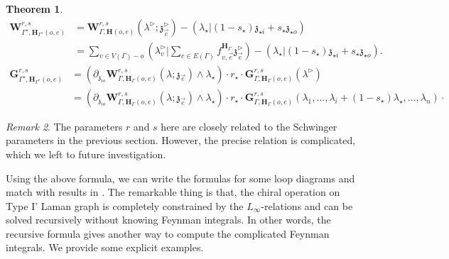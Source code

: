 \documentclass[11pt]{amsart}
\newtheorem{thm}{Theorem}[section]
\newtheorem{cor}[thm]{Corollary}
\theoremstyle{definition}
\theoremstyle{remark}
\newtheorem{rem}[thm]{Remark}
\numberwithin{equation}{section}
\begin{document}
\begin{thm}
\begin{align*}
      \mathbf{W}^{r,s}_{\Gamma^{\star},\mathbf{H}_{\Gamma^{\star}}(o,e)} &= \mathbf{W}^{r,s}_{\Gamma,\mathbf{H}(o,e)}(\lambda^\triangleright;\mathfrak{z}^\triangleright_{\vec{e}}) -\left(\lambda_{\star}|(1-s_{\star})\mathfrak{z}_{\star i}+s_{\star}\mathfrak{z}_{\star o}\right)\\
   & =\sum_{v\in V(\Gamma)-o}(\lambda^\triangleright_v|\sum_{e\in E(\Gamma)}f^{\mathbf{H}_{\Gamma}}_{v,\vec{e}}\mathfrak{z}^\triangleright_{\vec{e}})-\left(\lambda_{\star}|(1-s_{\star})\mathfrak{z}_{\star i}+s_{\star}\mathfrak{z}_{\star o}\right).
\end{align*}
\begin{align*}
  \mathbf{G}^{r,s}_{\Gamma^{\star},\mathbf{H}_{\Gamma^{\star}}(o,e)} &= \left(\partial_{\mathfrak{z}_{io}}\mathbf{W}^{r,s}_{\Gamma,\mathbf{H}_{\Gamma}(o,e)}(\lambda;\mathfrak{z}_{\vec{e}})\wedge\lambda_{\star}\right)\cdot  r_{\star}\cdot\mathbf{G}^{r,s}_{\Gamma,\mathbf{H}_{\Gamma}(o,e)}(\lambda^\triangleright) \\
   & =\left(\partial_{\mathfrak{z}_{io}}\mathbf{W}^{r,s}_{\Gamma,\mathbf{H}_{\Gamma}(o,e)}(\lambda;\mathfrak{z}_{\vec{e}})\wedge\lambda_{\star}\right)\cdot r_{\star}\cdot\mathbf{G}^{r,s}_{\Gamma,\mathbf{H}_{\Gamma}(o,e)}(\lambda_1,\dots,\lambda_i+(1-s_{\star})\lambda_{\star},\dots,\lambda_{n})\cdot
\end{align*}

\end{thm}

\iffalse
We have following corollaries.
\begin{cor}
  The value $\mu_{V(\Gamma)}\left(W_{\Gamma}(\mathfrak{z}_{\vec{e}})\right)$ for a type 1 Lamman graph is determined by the chiral 2-operation.
\end{cor}
\fi
\begin{rem}
    The parameters $r$ and $s$ here are closely related to the Schwinger parameters in the previous section. However, the precise relation is complicated, which we left to future investigation.
\end{rem}

Using the above formula, we can write the formulas for some loop diagrams and match with results in \cite{budzik2023feynman}.
The remarkable thing is that, the chiral operation on Type I' Laman graph is completely constrained by the $L_{\infty}
$-relations and can be solved recursively without knowing Feynman integrals.
In other words, the recursive formula gives another way to compute the complicated Feynman integrals.
We provide some explicit examples.
\end{document}
